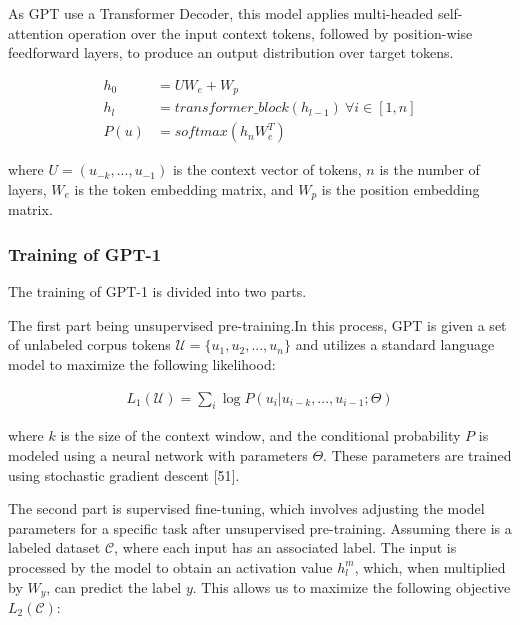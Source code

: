 \documentclass{IEEEtran}
\begin{document}
\par As GPT use a Transformer Decoder, this model applies multi-headed self-attention 
operation over the input context tokens, followed by position-wise feedforward layers, 
to produce an output distribution over target tokens.

\begin{align*}
    h_0 &= UW_e + W_p \\
    h_l &= transformer\_block(h_{l-1})\ \forall i \in \left[1, n\right] \\
    P(u) &= softmax(h_n W_e^T)
\end{align*}

\par where $U = (u_{-k}, ..., u_{-1})$ is the context vector of tokens, $n$ is the number of layers, 
$W_e$ is the token embedding matrix, and $W_p$ is the position embedding matrix.

\subsubsection{Training of GPT-1}

\par The training of GPT-1 is divided into two parts.

\par The first part being unsupervised pre-training.In this process, GPT is given a 
set of unlabeled corpus tokens $\mathcal{U} = \{u_1, u_2, ..., u_n \}$ and utilizes a standard language model to maximize 
the following likelihood:

\begin{align*}
    L_1(\mathcal{U}) = \sum_{i}\log P(u_i | u_{i-k}, ..., u_{i-1};\Theta )
\end{align*}

\par where $k$ is the size of the context window, and the conditional probability $P$ is 
modeled using a neural network with parameters $\Theta$. These parameters are trained 
using stochastic gradient descent [51].

The second part is supervised fine-tuning, which involves adjusting the model parameters 
for a specific task after unsupervised pre-training. Assuming there is a labeled 
dataset $\mathcal{C} $, where each input has an associated label. The input is processed by the 
model to obtain an activation value $h^m_l$, which, when multiplied by $W_y$, can predict the 
label $y$. This allows us to maximize the following objective $L_2(\mathcal{C})$:
\end{document}
